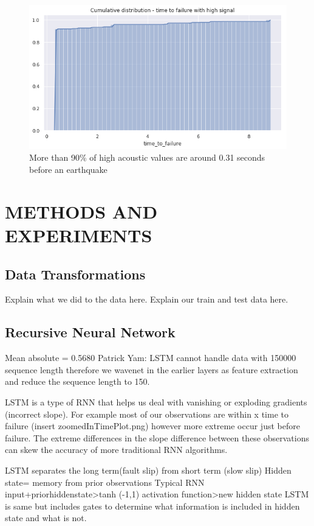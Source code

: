 \documentclass[]{llncs}
\begin{document}
\begin{figure}
	\centering
	\includegraphics[width=0.7\linewidth]{../GPUProject/moreThan90percent}
	\caption{More than 90\% of high acoustic values are around 0.31 seconds before an earthquake}
		\label{fig:morethan90percent}
	\end{figure}






\section{METHODS AND EXPERIMENTS}

\subsection{Data Transformations}
Explain what we did to the data here.
Explain our train and test data here.

\subsection{Recursive Neural Network}
Mean absolute = 0.5680
Patrick Yam: LSTM cannot handle data with 150000 sequence length therefore we wavenet in the earlier layers as feature extraction and reduce the sequence length to 150.\par

LSTM is a type of RNN that helps us deal with vanishing or exploding gradients (incorrect slope). For example most of our observations are within x time to failure (insert zoomedInTimePlot.png) however more extreme occur just before failure. The extreme differences in the slope difference between these observations can skew the accuracy of more traditional RNN algorithms.

LSTM separates the long term(fault slip) from short term (slow slip)
Hidden state= memory from prior observations
Typical RNN input+priorhiddenstate>tanh (-1,1) activation function>new hidden state
LSTM is same but includes gates to determine what information is included in hidden state and what is not.
\end{document}
